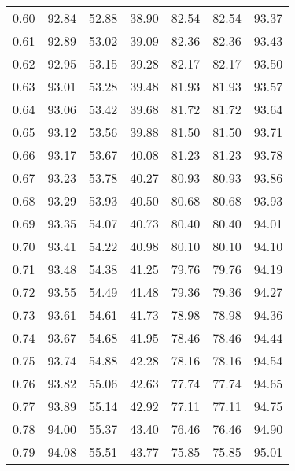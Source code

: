 \begin{tabular}{|c|c|c|c|c|c|c|}
      0.60 &     92.84 &     52.88 &      38.90 &   82.54 &      82.54 &         93.37 \\
      0.61 &     92.89 &     53.02 &      39.09 &   82.36 &      82.36 &         93.43 \\
      0.62 &     92.95 &     53.15 &      39.28 &   82.17 &      82.17 &         93.50 \\
      0.63 &     93.01 &     53.28 &      39.48 &   81.93 &      81.93 &         93.57 \\
      0.64 &     93.06 &     53.42 &      39.68 &   81.72 &      81.72 &         93.64 \\
      0.65 &     93.12 &     53.56 &      39.88 &   81.50 &      81.50 &         93.71 \\
      0.66 &     93.17 &     53.67 &      40.08 &   81.23 &      81.23 &         93.78 \\
      0.67 &     93.23 &     53.78 &      40.27 &   80.93 &      80.93 &         93.86 \\
      0.68 &     93.29 &     53.93 &      40.50 &   80.68 &      80.68 &         93.93 \\
      0.69 &     93.35 &     54.07 &      40.73 &   80.40 &      80.40 &         94.01 \\
      0.70 &     93.41 &     54.22 &      40.98 &   80.10 &      80.10 &         94.10 \\
      0.71 &     93.48 &     54.38 &      41.25 &   79.76 &      79.76 &         94.19 \\
      0.72 &     93.55 &     54.49 &      41.48 &   79.36 &      79.36 &         94.27 \\
      0.73 &     93.61 &     54.61 &      41.73 &   78.98 &      78.98 &         94.36 \\
      0.74 &     93.67 &     54.68 &      41.95 &   78.46 &      78.46 &         94.44 \\
      0.75 &     93.74 &     54.88 &      42.28 &   78.16 &      78.16 &         94.54 \\
      0.76 &     93.82 &     55.06 &      42.63 &   77.74 &      77.74 &         94.65 \\
      0.77 &     93.89 &     55.14 &      42.92 &   77.11 &      77.11 &         94.75 \\
      0.78 &     94.00 &     55.37 &      43.40 &   76.46 &      76.46 &         94.90 \\
      0.79 &     94.08 &     55.51 &      43.77 &   75.85 &      75.85 &         95.01 \\

\end{tabular}
